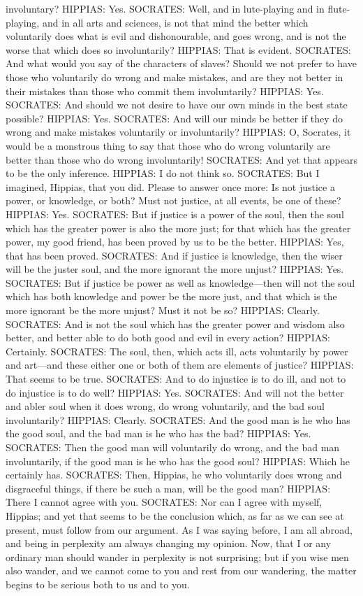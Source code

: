 \documentclass[11pt,letter]{article}
\begin{document}
involuntary? HIPPIAS:  Yes. SOCRATES:  Well, and in lute-playing and in flute-playing, and in all arts and sciences, is not that mind the better which voluntarily does what is evil and dishonourable, and goes wrong, and is not the worse that which does so involuntarily? HIPPIAS:  That is evident. SOCRATES:  And what would you say of the characters of slaves? Should we not prefer to have those who voluntarily do wrong and make mistakes, and are they not better in their mistakes than those who commit them involuntarily? HIPPIAS:  Yes. SOCRATES:  And should we not desire to have our own minds in the best state possible? HIPPIAS:  Yes. SOCRATES:  And will our minds be better if they do wrong and make mistakes voluntarily or involuntarily? HIPPIAS:  O, Socrates, it would be a monstrous thing to say that those who do wrong voluntarily are better than those who do wrong involuntarily! SOCRATES:  And yet that appears to be the only inference. HIPPIAS:  I do not think so. SOCRATES:  But I imagined, Hippias, that you did. Please to answer once more:  Is not justice a power, or knowledge, or both? Must not justice, at all events, be one of these? HIPPIAS:  Yes. SOCRATES:  But if justice is a power of the soul, then the soul which has the greater power is also the more just; for that which has the greater power, my good friend, has been proved by us to be the better. HIPPIAS:  Yes, that has been proved. SOCRATES:  And if justice is knowledge, then the wiser will be the juster soul, and the more ignorant the more unjust? HIPPIAS:  Yes. SOCRATES:  But if justice be power as well as knowledge—then will not the soul which has both knowledge and power be the more just, and that which is the more ignorant be the more unjust? Must it not be so? HIPPIAS:  Clearly. SOCRATES:  And is not the soul which has the greater power and wisdom also better, and better able to do both good and evil in every action? HIPPIAS:  Certainly. SOCRATES:  The soul, then, which acts ill, acts voluntarily by power and art—and these either one or both of them are elements of justice? HIPPIAS:  That seems to be true. SOCRATES:  And to do injustice is to do ill, and not to do injustice is to do well? HIPPIAS:  Yes. SOCRATES:  And will not the better and abler soul when it does wrong, do wrong voluntarily, and the bad soul involuntarily? HIPPIAS:  Clearly. SOCRATES:  And the good man is he who has the good soul, and the bad man is he who has the bad? HIPPIAS:  Yes. SOCRATES:  Then the good man will voluntarily do wrong, and the bad man involuntarily, if the good man is he who has the good soul? HIPPIAS:  Which he certainly has. SOCRATES:  Then, Hippias, he who voluntarily does wrong and disgraceful things, if there be such a man, will be the good man? HIPPIAS:  There I cannot agree with you. SOCRATES:  Nor can I agree with myself, Hippias; and yet that seems to be the conclusion which, as far as we can see at present, must follow from our argument. As I was saying before, I am all abroad, and being in perplexity am always changing my opinion. Now, that I or any ordinary man should wander in perplexity is not surprising; but if you wise men also wander, and we cannot come to you and rest from our wandering, the matter begins to be serious both to us and to you.
\end{document}
